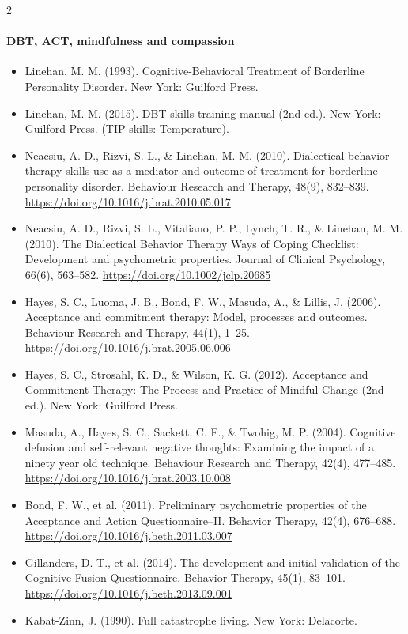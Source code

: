 \documentclass[10pt]{article}
\theoremstyle{definition}
\theoremstyle{remark}
\begin{document}
\begin{multicols}{2}
\paragraph{DBT, ACT, mindfulness and compassion}
\begin{itemize}[leftmargin=1em,itemsep=0pt,topsep=1pt,parsep=0pt]
\item Linehan, M. M. (1993). Cognitive-Behavioral Treatment of Borderline Personality Disorder. New York: Guilford Press.
\item Linehan, M. M. (2015). DBT skills training manual (2nd ed.). New York: Guilford Press. (TIP skills: Temperature).
\item Neacsiu, A. D., Rizvi, S. L., \& Linehan, M. M. (2010). Dialectical behavior therapy skills use as a mediator and outcome of treatment for borderline personality disorder. Behaviour Research and Therapy, 48(9), 832--839. \url{https://doi.org/10.1016/j.brat.2010.05.017}
\item Neacsiu, A. D., Rizvi, S. L., Vitaliano, P. P., Lynch, T. R., \& Linehan, M. M. (2010). The Dialectical Behavior Therapy Ways of Coping Checklist: Development and psychometric properties. Journal of Clinical Psychology, 66(6), 563--582. \url{https://doi.org/10.1002/jclp.20685}
\item Hayes, S. C., Luoma, J. B., Bond, F. W., Masuda, A., \& Lillis, J. (2006). Acceptance and commitment therapy: Model, processes and outcomes. Behaviour Research and Therapy, 44(1), 1--25. \url{https://doi.org/10.1016/j.brat.2005.06.006}
\item Hayes, S. C., Strosahl, K. D., \& Wilson, K. G. (2012). Acceptance and Commitment Therapy: The Process and Practice of Mindful Change (2nd ed.). New York: Guilford Press.
\item Masuda, A., Hayes, S. C., Sackett, C. F., \& Twohig, M. P. (2004). Cognitive defusion and self-relevant negative thoughts: Examining the impact of a ninety year old technique. Behaviour Research and Therapy, 42(4), 477--485. \url{https://doi.org/10.1016/j.brat.2003.10.008}
\item Bond, F. W., et al. (2011). Preliminary psychometric properties of the Acceptance and Action Questionnaire--II. Behavior Therapy, 42(4), 676--688. \url{https://doi.org/10.1016/j.beth.2011.03.007}
\item Gillanders, D. T., et al. (2014). The development and initial validation of the Cognitive Fusion Questionnaire. Behavior Therapy, 45(1), 83--101. \url{https://doi.org/10.1016/j.beth.2013.09.001}
\item Kabat-Zinn, J. (1990). Full catastrophe living. New York: Delacorte.

\end{itemize}
\end{multicols}
\end{document}
